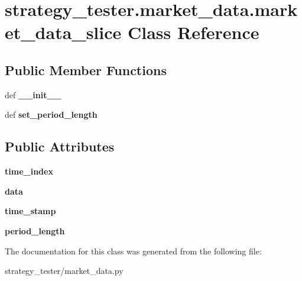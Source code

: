 \hypertarget{classstrategy__tester_1_1market__data_1_1market__data__slice}{\section{strategy\-\_\-tester.\-market\-\_\-data.\-market\-\_\-data\-\_\-slice \-Class \-Reference}
\label{classstrategy__tester_1_1market__data_1_1market__data__slice}
}
\subsection*{\-Public \-Member \-Functions}
\begin{DoxyCompactItemize}
\item 
\hypertarget{classstrategy__tester_1_1market__data_1_1market__data__slice_a5b572b9bf0863df6a11701d5d353fd34}{def {\bfseries \-\_\-\-\_\-init\-\_\-\-\_\-}}\label{classstrategy__tester_1_1market__data_1_1market__data__slice_a5b572b9bf0863df6a11701d5d353fd34}

\item 
\hypertarget{classstrategy__tester_1_1market__data_1_1market__data__slice_a0bff78126229c80a2e8b905dae315380}{def {\bfseries set\-\_\-period\-\_\-length}}\label{classstrategy__tester_1_1market__data_1_1market__data__slice_a0bff78126229c80a2e8b905dae315380}

\end{DoxyCompactItemize}
\subsection*{\-Public \-Attributes}
\begin{DoxyCompactItemize}
\item 
\hypertarget{classstrategy__tester_1_1market__data_1_1market__data__slice_aca4bcbef19d7e994e0668b878399e2c1}{{\bfseries time\-\_\-index}}\label{classstrategy__tester_1_1market__data_1_1market__data__slice_aca4bcbef19d7e994e0668b878399e2c1}

\item 
\hypertarget{classstrategy__tester_1_1market__data_1_1market__data__slice_a463f4b612f06ed2610a8d21109429bcd}{{\bfseries data}}\label{classstrategy__tester_1_1market__data_1_1market__data__slice_a463f4b612f06ed2610a8d21109429bcd}

\item 
\hypertarget{classstrategy__tester_1_1market__data_1_1market__data__slice_adff215c4541f64f6eca1c220d6450a2b}{{\bfseries time\-\_\-stamp}}\label{classstrategy__tester_1_1market__data_1_1market__data__slice_adff215c4541f64f6eca1c220d6450a2b}

\item 
\hypertarget{classstrategy__tester_1_1market__data_1_1market__data__slice_a7e506bf325e89faf64a758dfa5890519}{{\bfseries period\-\_\-length}}\label{classstrategy__tester_1_1market__data_1_1market__data__slice_a7e506bf325e89faf64a758dfa5890519}

\end{DoxyCompactItemize}


\-The documentation for this class was generated from the following file\-:\begin{DoxyCompactItemize}
\item 
strategy\-\_\-tester/market\-\_\-data.\-py\end{DoxyCompactItemize}

